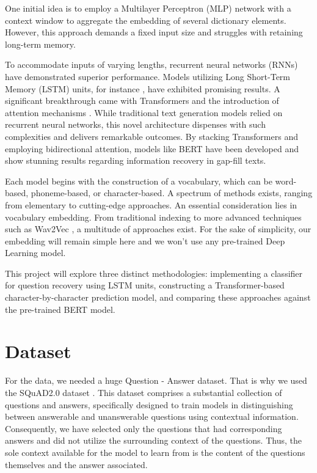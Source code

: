 \documentclass{article}
\begin{document}
One initial idea is to employ a Multilayer Perceptron (MLP) \cite{popescu2009multilayer} network with a context window to aggregate the embedding of several dictionary elements. However, this approach demands a fixed input size and struggles with retaining long-term memory.

To accommodate inputs of varying lengths, recurrent neural networks (RNNs) have demonstrated superior performance. Models utilizing Long Short-Term Memory (LSTM) units, for instance \cite{santhanam2020context}, have exhibited promising results. A significant breakthrough came with Transformers and the introduction of attention mechanisms \cite{vaswani2017attention}. While traditional text generation models relied on recurrent neural networks, this novel architecture dispenses with such complexities and delivers remarkable outcomes. By stacking Transformers and employing bidirectional attention, models like BERT \cite{devlin2019bert} have been developed and show stunning results regarding information recovery in gap-fill texts.

Each model begins with the construction of a vocabulary, which can be word-based, phoneme-based, or character-based. A spectrum of methods exists, ranging from elementary to cutting-edge approaches. An essential consideration lies in vocabulary embedding. From traditional indexing to more advanced techniques such as Wav2Vec \cite{schneider2019wav2vec}, a multitude of approaches exist. For the sake of simplicity, our embedding will remain simple here and we won't use any pre-trained Deep Learning model.

This project will explore three distinct methodologies: implementing a classifier for question recovery using LSTM units, constructing a Transformer-based character-by-character prediction model, and comparing these approaches against the pre-trained BERT model.

\section{Dataset}

For the data, we needed a huge Question - Answer dataset. That is why we used the SQuAD2.0 dataset \cite{squad}. This dataset comprises a substantial collection of questions and answers, specifically designed to train models in distinguishing between answerable and unanswerable questions using contextual information. Consequently, we have selected only the questions that had corresponding answers and did not utilize the surrounding context of the questions. Thus, the sole context available for the model to learn from is the content of the questions themselves and the answer associated.
\end{document}
